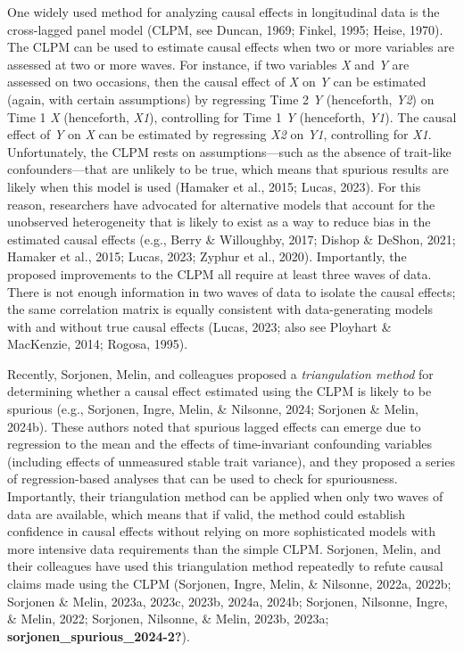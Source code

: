 \documentclass[
  man,floatsintext]{apa6}
\begin{document}
One widely used method for analyzing causal effects in longitudinal data is the cross-lagged panel model (CLPM, see Duncan, 1969; Finkel, 1995; Heise, 1970). The CLPM can be used to estimate causal effects when two or more variables are assessed at two or more waves. For instance, if two variables \emph{X} and \emph{Y} are assessed on two occasions, then the causal effect of \emph{X} on \emph{Y} can be estimated (again, with certain assumptions) by regressing Time 2 \emph{Y} (henceforth, \emph{Y2}) on Time 1 \emph{X} (henceforth, \emph{X1}), controlling for Time 1 \emph{Y} (henceforth, \emph{Y1}). The causal effect of \emph{Y} on \emph{X} can be estimated by regressing \emph{X2} on \emph{Y1}, controlling for \emph{X1}. Unfortunately, the CLPM rests on assumptions---such as the absence of trait-like confounders---that are unlikely to be true, which means that spurious results are likely when this model is used (Hamaker et al., 2015; Lucas, 2023). For this reason, researchers have advocated for alternative models that account for the unobserved heterogeneity that is likely to exist as a way to reduce bias in the estimated causal effects (e.g., Berry \& Willoughby, 2017; Dishop \& DeShon, 2021; Hamaker et al., 2015; Lucas, 2023; Zyphur et al., 2020). Importantly, the proposed improvements to the CLPM all require at least three waves of data. There is not enough information in two waves of data to isolate the causal effects; the same correlation matrix is equally consistent with data-generating models with and without true causal effects (Lucas, 2023; also see Ployhart \& MacKenzie, 2014; Rogosa, 1995).

Recently, Sorjonen, Melin, and colleagues proposed a \emph{triangulation method} for determining whether a causal effect estimated using the CLPM is likely to be spurious (e.g., Sorjonen, Ingre, Melin, \& Nilsonne, 2024; Sorjonen \& Melin, 2024b). These authors noted that spurious lagged effects can emerge due to regression to the mean and the effects of time-invariant confounding variables (including effects of unmeasured stable trait variance), and they proposed a series of regression-based analyses that can be used to check for spuriousness. Importantly, their triangulation method can be applied when only two waves of data are available, which means that if valid, the method could establish confidence in causal effects without relying on more sophisticated models with more intensive data requirements than the simple CLPM. Sorjonen, Melin, and their colleagues have used this triangulation method repeatedly to refute causal claims made using the CLPM (Sorjonen, Ingre, Melin, \& Nilsonne, 2022a, 2022b; Sorjonen \& Melin, 2023a, 2023c, 2023b, 2024a, 2024b; Sorjonen, Nilsonne, Ingre, \& Melin, 2022; Sorjonen, Nilsonne, \& Melin, 2023b, 2023a; \textbf{sorjonen\_spurious\_2024-2?}).
\end{document}
